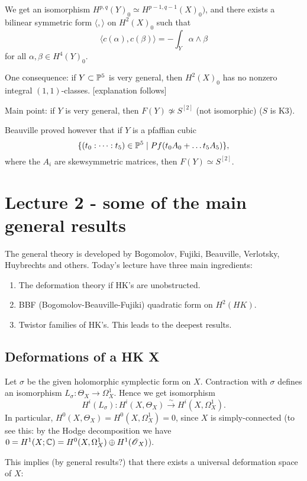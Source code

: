 \documentclass[11pt, english]{article}
\begin{document}
We get an isomorphism $H^{p,q}(Y)_0 \simeq H^{p-1,q-1}(X)_0)$, and there exists a bilinear symmetric form $\langle, \rangle$ on $H^2(X)_0$ such that
$$
\langle c(\alpha), c(\beta) \rangle = - \int_Y \alpha \wedge \beta
$$
for all $\alpha, \beta \in H^4(Y)_0$. 

One consequence: if $Y \subset \mathbb{P}^5$ is very general, then $H^2(X)_0$ has no nonzero integral $(1,1)$-classes. [explanation follows]

Main point: if $Y$ is very general, then $F(Y) \not \simeq S^{[2]}$ (not isomorphic) ($S$ is K3).

Beauville proved however that if $Y$ is a pfaffian cubic
$$
\{ (t_0: \cdots : t_5) \in \mathbb{P}^5 \mid Pf(t_0A_0+\ldots t_5A_5)\},
$$
where the $A_i$ are skewsymmetric matrices, then $F(Y) \simeq S^{[2]}$. 



\section{Lecture 2 - some of the main general results}

The general theory is developed by Bogomolov, Fujiki, Beauville, Verlotsky, Huybrechts and others. Today's lecture have three main ingredients:

\begin{enumerate}
	\item The deformation theory if HK's are unobstructed.
	\item BBF (Bogomolov-Beauville-Fujiki) quadratic form on $H^2(HK)$.
	\item Twistor families of HK's. This leads to the deepest results.
\end{enumerate}


\subsection{Deformations of a HK X}

Let $\sigma$ be the given holomorphic symplectic form on $X$. Contraction with $\sigma$ defines an isomorphism $L_\sigma: \Theta_X \to \Omega_X^1$.  Hence we get isomorphism
$$
H^i(L_\sigma):H^i(X, \Theta_X) \xrightarrow{\sim} H^i(X,\Omega_X^1).
$$
In particular, $H^0(X, \Theta_X) = H^0(X,\Omega_X^1) = 0$, since $X$ is simply-connected (to see this: by the Hodge decomposition we have $0 = H^1(X; \mathbb{C}) = H^0(X, \Omega_X^1) \oplus H^1(\operatorname{\mathscr{O}}_X)$).

This implies (by general results?) that there exists a universal deformation space of $X$:
\end{document}
